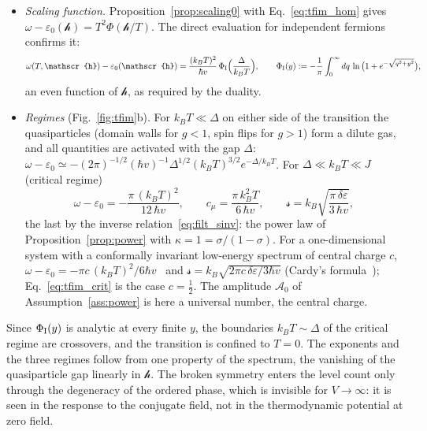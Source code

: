 \documentclass[10pt,a4paper]{article}
\theoremstyle{plain}
\newcommand{\cA}{{\mathcal{A}_0}}   %
\newcommand{\hfield}{\mathscr{h}}  %
\newcommand{\lds}{\mathscr{s}}  %
\begin{document}
\begin{itemize}
  which is Eq.~\eqref{eq:filt_qcp} with $d=1$, $z=1$ and $\nu=1$. The
  assumption follows from the single-particle spectrum alone. The
  ground-state energy~\eqref{eq:tfim_ground} is the case $1/b=2$ of the
  matching condition~\eqref{eq:tools_match}: $|\hfield|^{1/b}$ is analytic,
  and the singular term carries a logarithm (Appendix~\ref{sec:tools_logs},
  the case $\sigma=2$ there).
\item \emph{Scaling function.} Proposition~\ref{prop:scaling0} with
  Eq.~\eqref{eq:tfim_hom} gives
  $\omega-\varepsilon_0(\hfield)=T^{2}\Phi(\hfield/T)$. The direct
  evaluation for independent fermions confirms it:
  \begin{equation}\label{eq:tfim_omega}
    \omega(T,\hfield)-\varepsilon_0(\hfield)
    =\frac{(k_BT)^{2}}{\hbar v}\,\Phi_{\rm I}\Big(\frac{\Delta}{k_BT}\Big) ,
    \qquad
    \Phi_{\rm I}(y):=-\frac1\pi\int_0^{\infty}dq\,\ln\big(1+e^{-\sqrt{q^{2}+y^{2}}}\big) ,
  \end{equation}
  an even function of $\hfield$, as required by the duality.
\item \emph{Regimes} (Fig.~\ref{fig:tfim}b). For $k_BT\ll\Delta$ on either
  side of the transition the quasiparticles (domain walls for $g<1$, spin
  flips for $g>1$) form a dilute gas, and all quantities are activated with
  the gap $\Delta$:
  $\omega-\varepsilon_0\simeq-(2\pi)^{-1/2}(\hbar v)^{-1}\Delta^{1/2}(k_BT)^{3/2}e^{-\Delta/k_BT}$.
  For $\Delta\ll k_BT\ll J$ (critical regime)
  \begin{equation}\label{eq:tfim_crit}
    \omega-\varepsilon_0=-\frac{\pi\,(k_BT)^{2}}{12\,\hbar v} ,
    \qquad
    c_\mu=\frac{\pi\,k_B^{2}T}{6\,\hbar v} ,
    \qquad
    \lds=k_B\sqrt{\frac{\pi\,\delta\varepsilon}{3\,\hbar v}} ,
  \end{equation}
  the last by the inverse relation~\eqref{eq:filt_sinv}: the power law of
  Proposition~\ref{prop:power} with $\kappa=1=\sigma/(1-\sigma)$. For a
  one-dimensional system with a conformally invariant low-energy spectrum of
  central charge $c$, $\omega-\varepsilon_0=-\pi c\,(k_BT)^{2}/6\hbar v$~\cite{Affleck1986}
  and $\lds=k_B\sqrt{2\pi c\,\delta\varepsilon/3\hbar v}$ (Cardy's
  formula~\cite{Cardy1986}); Eq.~\eqref{eq:tfim_crit} is the case
  $c=\tfrac12$. The amplitude $\cA$ of Assumption~\ref{ass:power} is here a
  universal number, the central charge.
\end{itemize}
Since $\Phi_{\rm I}(y)$ is analytic at every finite $y$, the boundaries
$k_BT\sim\Delta$ of the critical regime are crossovers, and the transition
is confined to $T=0$. The exponents and the three regimes follow from one
property of the spectrum, the vanishing of the quasiparticle gap linearly
in $\hfield$. The broken symmetry enters the level count only through the
degeneracy of the ordered phase, which is invisible for $V\to\infty$: it is
seen in the response to the conjugate field, not in the thermodynamic
potential at zero field.
\end{document}
